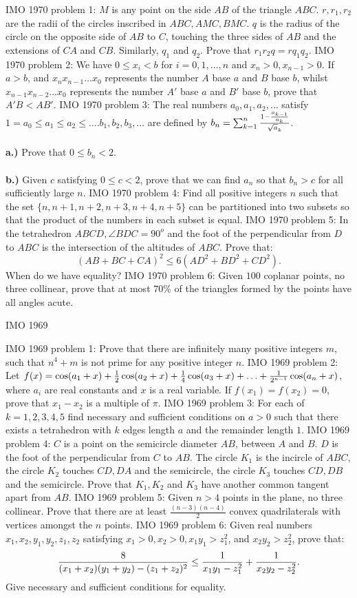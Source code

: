 IMO 1970 problem 1:  $M$ is any point on the side $AB$ of the triangle $ABC$. $r,r_1,r_2$ are the radii of the circles inscribed in $ABC,AMC,BMC$. $q$ is the radius of the circle on the opposite side of $AB$ to $C$, touching the three sides of $AB$ and the extensions of $CA$ and $CB$. Similarly, $q_1$ and $q_2$. Prove that $r_1r_2q=rq_1q_2$. 
IMO 1970 problem 2:  We have $0\le x_i<b$ for $i=0,1,\ldots,n$ and $x_n>0,x_{n-1}>0$. If $a>b$, and $x_nx_{n-1}\ldots x_0$ represents the number $A$ base $a$ and $B$ base $b$, whilst $x_{n-1}x_{n-2}\ldots x_0$ represents the number $A'$ base $a$ and $B'$ base $b$, prove that $A'B<AB'$. 
IMO 1970 problem 3:  The real numbers $a_0,a_1,a_2,\ldots$ satisfy $1=a_0\le a_1\le a_2\le\ldots. b_1,b_2,b_3,\ldots$ are defined by $b_n=\sum_{k=1}^n{1-{a_{k-1}\over a_k}\over\sqrt a_k}$. \\\\
\textbf{a.)} Prove that $0\le b_n<2$. \\\\
\textbf{b.)} Given $c$ satisfying $0\le c<2$, prove that we can find $a_n$ so that $b_n>c$ for all sufficiently large $n$. 
IMO 1970 problem 4:  Find all positive integers $n$ such that the set $\{n,n+1,n+2,n+3,n+4,n+5\}$ can be partitioned into two subsets so that the product of the numbers in each subset is equal. 
IMO 1970 problem 5:  In the tetrahedron $ABCD,\angle BDC=90^o$ and the foot of the perpendicular from $D$ to $ABC$ is the intersection of the altitudes of $ABC$. Prove that:
\[ (AB+BC+CA)^2\le6(AD^2+BD^2+CD^2). \]
When do we have equality? 
IMO 1970 problem 6:  Given $100$ coplanar points, no three collinear, prove that at most $70\%$ of the triangles formed by the points have all angles acute. 

IMO 1969 

IMO 1969 problem 1:  Prove that there are infinitely many positive integers $m$, such that $n^4+m$ is not prime for any positive integer $n$. 
IMO 1969 problem 2:  Let $f(x)=\cos(a_1+x)+{1\over2}\cos(a_2+x)+{1\over4}\cos(a_3+x)+\ldots+{1\over2^{n-1}}\cos(a_n+x)$, where $a_i$ are real constants and $x$ is a real variable. If $f(x_1)=f(x_2)=0$, prove that $x_1-x_2$ is a multiple of $\pi$. 
IMO 1969 problem 3:  For each of $k=1,2,3,4,5$ find necessary and sufficient conditions on $a>0$ such that there exists a tetrahedron with $k$ edges length $a$ and the remainder length $1$. 
IMO 1969 problem 4:  $C$ is a point on the semicircle diameter $AB$, between $A$ and $B$. $D$ is the foot of the perpendicular from $C$ to $AB$. The circle $K_1$ is the incircle of $ABC$, the circle $K_2$ touches $CD,DA$ and the semicircle, the circle $K_3$ touches $CD,DB$ and the semicircle. Prove that $K_1,K_2$ and $K_3$ have another common tangent apart from $AB$. 
IMO 1969 problem 5:  Given $n>4$ points in the plane, no three collinear. Prove that there are at least $\frac{(n-3)(n-4)}{2}$ convex quadrilaterals with vertices amongst the $n$ points. 
IMO 1969 problem 6:  Given real numbers $x_1,x_2,y_1,y_2,z_1,z_2$ satisfying $x_1>0,x_2>0,x_1y_1>z_1^2$, and $x_2y_2>z_2^2$, prove that:
\[ {8\over(x_1+x_2)(y_1+y_2)-(z_1+z_2)^2}\le{1\over x_1y_1-z_1^2}+{1\over x_2y_2-z_2^2}. \]
Give necessary and sufficient conditions for equality. 

